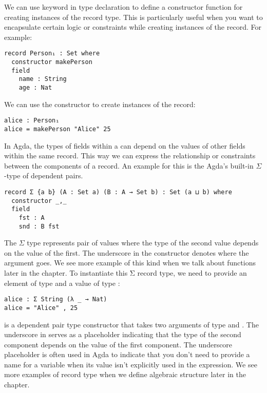 We can use  keyword in  type declaration to
define a constructor function for creating instances of the record type. This is
particularly useful when you want to encapsulate certain logic or constraints
while creating instances of the record. For example:

\begin{verbatim}
record Person₁ : Set where
  constructor makePerson
  field
    name : String
    age : Nat
\end{verbatim}

We can use the constructor  to create instances of the 
record:

\begin{verbatim}
alice : Person₁
alice = makePerson "Alice" 25
\end{verbatim}

In Agda, the types of fields within a  can depend on the values
of other fields within the same record. This way we can express the relationship
or constraints between the components of a record. An example for this is the
Agda's built-in $\Sigma$-type of dependent pairs.

\begin{verbatim}
record Σ {a b} (A : Set a) (B : A → Set b) : Set (a ⊔ b) where
  constructor _,_
  field
    fst : A
    snd : B fst
\end{verbatim}

The $\Sigma$ type represents pair of values where the type of the second value
depends on the value of the first. The underscore in the constructor denotes
where the argument goes. We see more example of this kind when we talk about
functions later in the chapter. To instantiate this Σ record type, we need to
provide an element of type  and a value of type :

\begin{verbatim}
alice : Σ String (λ _ → Nat)
alice = "Alice" , 25
\end{verbatim}

 is a dependent pair type constructor that takes two arguments of type
 and . The underscore in 
serves as a placeholder indicating that the type of the second component depends
on the value of the first component. The underscore \inline{(_)} placeholder is
often used in Agda to indicate that you don't need to provide a name for a
variable when its value isn't explicitly used in the expression. We see more
examples of record type when we define algebraic structure later in the chapter. 

